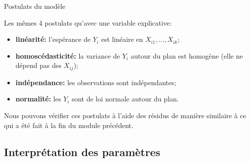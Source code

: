 \documentclass{BeamerTemplate}
\begin{document}
\begin{frame}[t]{Postulats du modèle}

{\small
Les m\^emes 4 postulats qu'avec une variable explicative:
\begin{itemize}\itemsep3mm
\item[P1] {\bf  linéarité:} l'espérance de $Y_i$ est linéaire en $X_{i1},\ldots,X_{ik}$;\\
    {}
\item[P2] {\bf homoscédasticité:}  la variance de $Y_i$ autour du plan est homogène (elle ne dépend pas des $X_{ij}$);\\
    {}
\item[P3]  {\bf indépendance:}  les observations sont indépendantes;\\
    {}
\item[P4]  {\bf  normalité:} les $Y_i$ sont de loi normale autour du plan.\\
    {}
\end{itemize}
}

{Nous pouvons vérifier ces postulats à l'aide des résidus de manière similaire à
ce qui a été fait à la fin du module précédent.}
\end{frame}

\subsection{Interprétation des paramètres}
\end{document}
